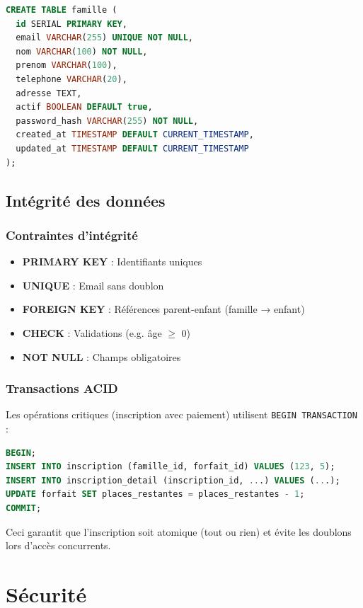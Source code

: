 \documentclass[11pt,a4paper]{article}
\begin{document}
\begin{lstlisting}[language=SQL]
CREATE TABLE famille (
  id SERIAL PRIMARY KEY,
  email VARCHAR(255) UNIQUE NOT NULL,
  nom VARCHAR(100) NOT NULL,
  prenom VARCHAR(100),
  telephone VARCHAR(20),
  adresse TEXT,
  actif BOOLEAN DEFAULT true,
  password_hash VARCHAR(255) NOT NULL,
  created_at TIMESTAMP DEFAULT CURRENT_TIMESTAMP,
  updated_at TIMESTAMP DEFAULT CURRENT_TIMESTAMP
);
\end{lstlisting}

\subsection{Intégrité des données}

\subsubsection{Contraintes d'intégrité}
\begin{itemize}
  \item \textbf{PRIMARY KEY} : Identifiants uniques
  \item \textbf{UNIQUE} : Email sans doublon
  \item \textbf{FOREIGN KEY} : Références parent-enfant (famille → enfant)
  \item \textbf{CHECK} : Validations (e.g. âge $\geq$ 0)
  \item \textbf{NOT NULL} : Champs obligatoires
\end{itemize}

\subsubsection{Transactions ACID}

Les opérations critiques (inscription avec paiement) utilisent \texttt{BEGIN TRANSACTION} :

\begin{lstlisting}[language=SQL]
BEGIN;
INSERT INTO inscription (famille_id, forfait_id) VALUES (123, 5);
INSERT INTO inscription_detail (inscription_id, ...) VALUES (...);
UPDATE forfait SET places_restantes = places_restantes - 1;
COMMIT;
\end{lstlisting}

Ceci garantit que l'inscription soit atomique (tout ou rien) et évite les doublons lors d'accès concurrents.

\section{Sécurité}
\end{document}
